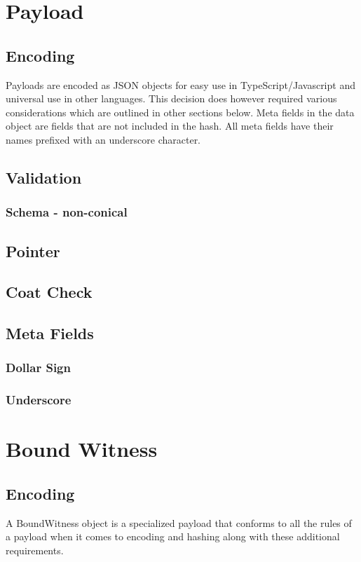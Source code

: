 \documentclass{article}
\begin{document}
\clearpage
\section{Payload}
\subsection{Encoding}
Payloads are encoded as JSON objects for easy use in TypeScript/Javascript and universal use in other languages.  This decision does however required various considerations which are outlined in other sections below. Meta fields in the data object are fields that are not included in the hash.  All meta fields have their names prefixed with an underscore character.

\subsection{Validation}
\subsubsection{Schema - non-conical}

\subsection{Pointer}
\subsection{Coat Check}
\subsection{Meta Fields}
\subsubsection{Dollar Sign}
\subsubsection{Underscore}

\section{Bound Witness}
\subsection{Encoding}
A BoundWitness object is a specialized payload that conforms to all the rules of a payload when it comes to encoding and hashing along with these additional requirements.
\end{document}
